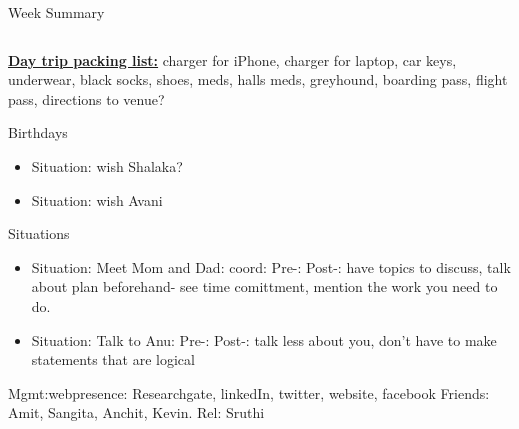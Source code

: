 \documentclass[serif, mathserif, final]{beamer}
\begin{document}
\begin{frame}
\begin{columns}
\begin{column}{0.5\linewidth}
\begin{block}{Week Summary}
\begin{column}{0.25\linewidth}
      \textbf{\underline{Day trip packing list:}} charger for iPhone, charger for laptop,
      car keys, underwear, black socks, shoes, meds, halls meds, greyhound,
      boarding pass, flight pass, directions to venue? \\ 

      \begin{block} {Birthdays}       
        \begin{itemize} 
        \tiny  \item \tiny Situation: wish Shalaka? 
        \item \tiny Situation: wish Avani 
        \end{itemize} 
      \end{block} 

      \begin{block}{Situations}

        \begin{itemize}
          \tiny \item \tiny Situation: Meet Mom and Dad:  coord:
          Pre-:  Post-: have topics to discuss, talk about plan
          beforehand- see time comittment, mention the work you need to do.  
      
          
        \item \tiny Situation: Talk to Anu:  Pre-:   Post-:  talk less
          about you, don't have to make statements that are logical 
 
        \end{itemize} 
      \end{block}


\begin{block}
  Mgmt:webpresence:
  Researchgate, linkedIn, twitter, website, facebook
  Friends: Amit, Sangita, Anchit, Kevin.
  Rel: Sruthi
\end{block}


\end{column}
\end{block}
\end{column}
\end{columns}
\end{frame}
\end{document}
